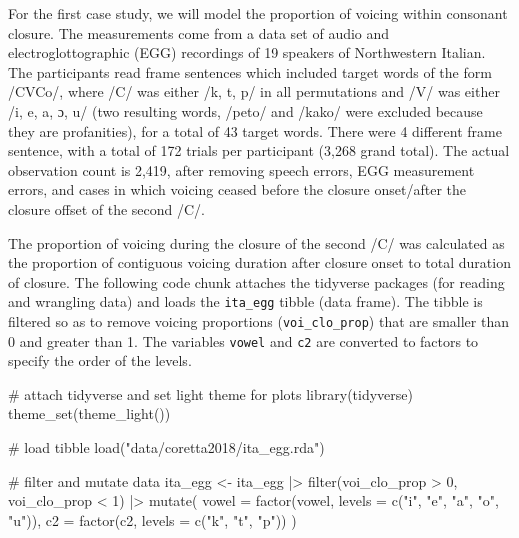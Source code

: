 \documentclass[
  authoryear,
  preprint,
  3p]{elsarticle}
\newenvironment{Shaded}{\begin{snugshade}}{\end{snugshade}}
\newcommand{\AttributeTok}[1]{\textcolor[rgb]{0.40,0.45,0.13}{#1}}
\newcommand{\CommentTok}[1]{\textcolor[rgb]{0.37,0.37,0.37}{#1}}
\newcommand{\DecValTok}[1]{\textcolor[rgb]{0.68,0.00,0.00}{#1}}
\newcommand{\FunctionTok}[1]{\textcolor[rgb]{0.28,0.35,0.67}{#1}}
\newcommand{\NormalTok}[1]{\textcolor[rgb]{0.00,0.23,0.31}{#1}}
\newcommand{\OtherTok}[1]{\textcolor[rgb]{0.00,0.23,0.31}{#1}}
\newcommand{\SpecialCharTok}[1]{\textcolor[rgb]{0.37,0.37,0.37}{#1}}
\newcommand{\StringTok}[1]{\textcolor[rgb]{0.13,0.47,0.30}{#1}}
\begin{document}
For the first case study, we will model the proportion of voicing within
consonant closure. The measurements come from a data set of audio and
electroglottographic (EGG) recordings of 19 speakers of Northwestern
Italian. The participants read frame sentences which included target
words of the form /CVCo/, where /C/ was either /k, t, p/ in all
permutations and /V/ was either /i, e, a, ɔ, u/ (two resulting words,
/peto/ and /kako/ were excluded because they are profanities), for a
total of 43 target words. There were 4 different frame sentence, with a
total of 172 trials per participant (3,268 grand total). The actual
observation count is 2,419, after removing speech errors, EGG
measurement errors, and cases in which voicing ceased before the closure
onset/after the closure offset of the second /C/.

The proportion of voicing during the closure of the second /C/ was
calculated as the proportion of contiguous voicing duration after
closure onset to total duration of closure. The following code chunk
attaches the tidyverse packages (for reading and wrangling data) and
loads the \texttt{ita\_egg} tibble (data frame). The tibble is filtered
so as to remove voicing proportions (\texttt{voi\_clo\_prop}) that are
smaller than 0 and greater than 1. The variables \texttt{vowel} and
\texttt{c2} are converted to factors to specify the order of the levels.

\begin{Shaded}
\begin{Highlighting}[]
\CommentTok{\# attach tidyverse and set light theme for plots}
\FunctionTok{library}\NormalTok{(tidyverse)}
\FunctionTok{theme\_set}\NormalTok{(}\FunctionTok{theme\_light}\NormalTok{())}

\CommentTok{\# load tibble}
\FunctionTok{load}\NormalTok{(}\StringTok{"data/coretta2018/ita\_egg.rda"}\NormalTok{)}

\CommentTok{\# filter and mutate data}
\NormalTok{ita\_egg }\OtherTok{\textless{}{-}}\NormalTok{ ita\_egg }\SpecialCharTok{|\textgreater{}} 
  \FunctionTok{filter}\NormalTok{(voi\_clo\_prop }\SpecialCharTok{\textgreater{}} \DecValTok{0}\NormalTok{, voi\_clo\_prop }\SpecialCharTok{\textless{}} \DecValTok{1}\NormalTok{) }\SpecialCharTok{|\textgreater{}} 
  \FunctionTok{mutate}\NormalTok{(}
    \AttributeTok{vowel =} \FunctionTok{factor}\NormalTok{(vowel, }\AttributeTok{levels =} \FunctionTok{c}\NormalTok{(}\StringTok{"i"}\NormalTok{, }\StringTok{"e"}\NormalTok{, }\StringTok{"a"}\NormalTok{, }\StringTok{"o"}\NormalTok{, }\StringTok{"u"}\NormalTok{)),}
    \AttributeTok{c2 =} \FunctionTok{factor}\NormalTok{(c2, }\AttributeTok{levels =} \FunctionTok{c}\NormalTok{(}\StringTok{"k"}\NormalTok{, }\StringTok{"t"}\NormalTok{, }\StringTok{"p"}\NormalTok{))}
\NormalTok{  )}
\end{Highlighting}
\end{Shaded}
\end{document}
